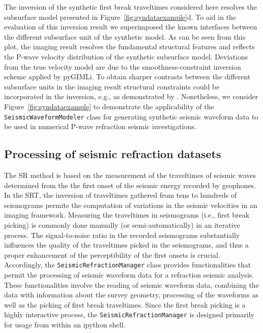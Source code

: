 \documentclass[a4paper,fleqn]{cas-sc}
\begin{document}
The inversion of the synthetic first break traveltimes considered here resolves the subsurface model presented in Figure~\ref{fig:syndataexample}d. To aid in the evaluation of this inversion result we superimposed the known interfaces between the different subsurface unit of the synthetic model. As can be seen from this plot, the imaging result resolves the fundamental structural features  and reflects the P-wave velocity distribution of the synthetic subsurface model. Deviations from the true velocity model are due to the smoothness-constraint inversion scheme applied by pyGIMLi. To obtain sharper contrasts between the different subsurface units in the imaging result structural constraints could be incorporated in the inversion, e.g., as demonstrated by \citep{steiner2021}. Nonetheless, we consider Figure~\ref{fig:syndataexample} to demonstrate the applicability of the \texttt{SeismicWaveformModeler} class for generating synthetic seismic waveform data to be used in numerical P-wave refraction seismic investigations.

\subsection{Processing of seismic refraction datasets}

The SR method is based on the measurement of the traveltimes of seismic waves determined from the the first onset of the seismic energy recorded by geophones. In the SRT, the inversion of traveltimes gathered from tens to hundreds of seismograms permits the computation of variations in the seismic velocities in an imaging framework. Measuring the traveltimes in seismograms (i.e., first break picking) is commonly done manually (or semi-automatically) in an iterative process. The signal-to-noise ratio in the recorded seismograms substantially influences the quality of the traveltimes picked in the seismograms, and thus a proper enhancement of the perceptibility of the first onsets is crucial.
Accordingly, the \texttt{SeismicRefractionManager} class provides functionalities that permit the processing of seismic waveform data for a refraction seismic analysis. These functionalities involve the reading of seismic waveform data, combining the data with information about the survey geometry, processing of the waveforms as well as the picking of first break traveltimes. Since the first break picking is a highly interactive process, the \texttt{SeismicRefractionManager} is designed primarily for usage from within an ipython shell.
\end{document}
